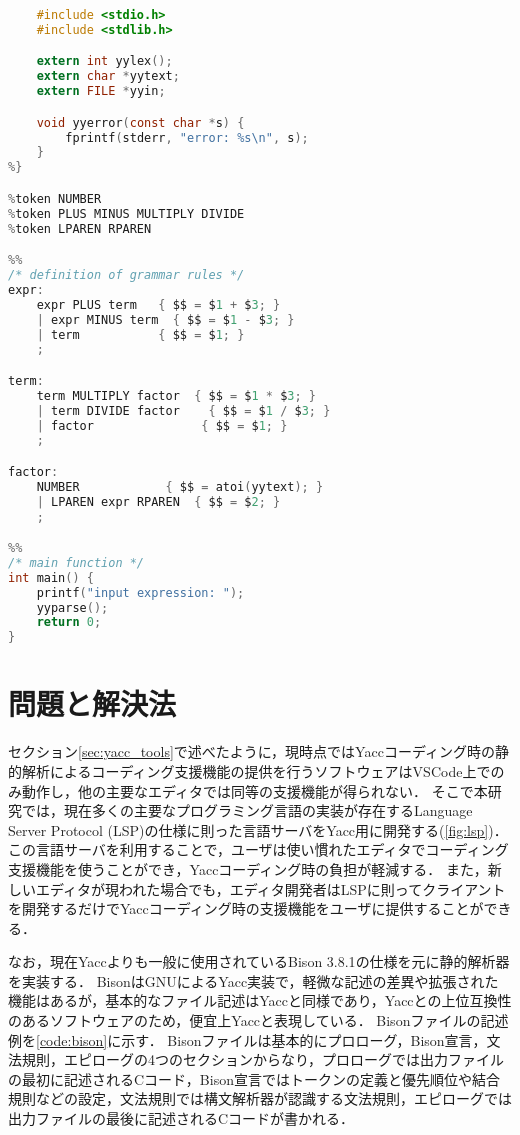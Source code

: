 \documentclass[fontsize=9bp,twocolumn,column_gap=2.36zw,a4paper,report]{jlreq}
\begin{document}
\begin{lstlisting}[caption=Bisonの記述例,label=code:bison,language=c]
%{
    #include <stdio.h>
    #include <stdlib.h>

    extern int yylex();
    extern char *yytext;
    extern FILE *yyin;

    void yyerror(const char *s) {
        fprintf(stderr, "error: %s\n", s);
    }
%}

%token NUMBER
%token PLUS MINUS MULTIPLY DIVIDE
%token LPAREN RPAREN

%%
/* definition of grammar rules */
expr:
    expr PLUS term   { $$ = $1 + $3; }
    | expr MINUS term  { $$ = $1 - $3; }
    | term           { $$ = $1; }
    ;

term:
    term MULTIPLY factor  { $$ = $1 * $3; }
    | term DIVIDE factor    { $$ = $1 / $3; }
    | factor               { $$ = $1; }
    ;

factor:
    NUMBER            { $$ = atoi(yytext); }
    | LPAREN expr RPAREN  { $$ = $2; }
    ;

%%
/* main function */
int main() {
    printf("input expression: ");
    yyparse();
    return 0;
}
\end{lstlisting}

\chapter{問題と解決法}\label{ch:probsolv}

セクション\ref{sec:yacc_tools}で述べたように，現時点ではYaccコーディング時の静的解析によるコーディング支援機能の提供を行うソフトウェアはVSCode上でのみ動作し，他の主要なエディタでは同等の支援機能が得られない．
そこで本研究では，現在多くの主要なプログラミング言語の実装が存在するLanguage Server Protocol (LSP)\cite{lsp}の仕様に則った言語サーバをYacc用に開発する(\ref{fig:lsp})．
この言語サーバを利用することで，ユーザは使い慣れたエディタでコーディング支援機能を使うことができ，Yaccコーディング時の負担が軽減する．
また，新しいエディタが現われた場合でも，エディタ開発者はLSPに則ってクライアントを開発するだけでYaccコーディング時の支援機能をユーザに提供することができる．\par
なお，現在Yaccよりも一般に使用されているBison 3.8.1\cite{bison}の仕様を元に静的解析器を実装する．
BisonはGNUによるYacc実装で，軽微な記述の差異や拡張された機能はあるが，基本的なファイル記述はYaccと同様であり，Yaccとの上位互換性のあるソフトウェアのため，便宜上Yaccと表現している．
Bisonファイルの記述例を\ref{code:bison}に示す．
Bisonファイルは基本的にプロローグ，Bison宣言，文法規則，エピローグの4つのセクションからなり，プロローグでは出力ファイルの最初に記述されるCコード，Bison宣言ではトークンの定義と優先順位や結合規則などの設定，文法規則では構文解析器が認識する文法規則，エピローグでは出力ファイルの最後に記述されるCコードが書かれる．
\newline
\end{document}

